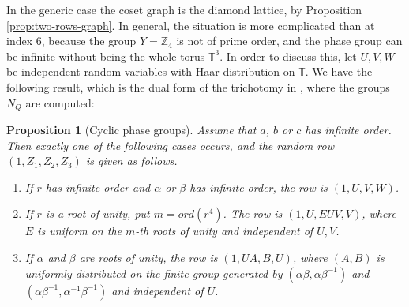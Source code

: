 \documentclass[11pt,reqno]{amsart}
\newtheorem{prop}[thm]{Proposition}
\theoremstyle{definition}
\numberwithin{equation}{section}
\begin{document}
In the generic case the coset graph is the diamond lattice, by Proposition \ref{prop:two-rows-graph}. In general, the situation is more complicated than at index 6, because the group $Y=\mathbb Z_4$ is not of prime order, and the phase group can be infinite without being the whole torus $\mathbb T^3$. In order to discuss this, let $U,V,W$ be independent random variables with Haar distribution on $\mathbb T$. We have the following result, which is the dual form of the trichotomy in \cite[Theorem 4.7]{BO26}, where the groups $N_Q$ are computed:

\begin{prop}[Cyclic phase groups]\label{prop:eight-cyclic}
Assume that $a$, $b$ or $c$ has infinite order. Then exactly one of the following cases occurs, and the random row $(1,Z_1,Z_2,Z_3)$ is given as follows.
\begin{enumerate}
\item If $r$ has infinite order and $\alpha$ or $\beta$ has infinite order, the row is $(1,U,V,W)$.
\item If $r$ is a root of unity, put $m=ord(r^4)$. The row is $(1,U,EUV,V)$, where $E$ is uniform on the $m$-th roots of unity and independent of $U,V$.
\item If $\alpha$ and $\beta$ are roots of unity, the row is $(1,UA,B,U)$, where $(A,B)$ is uniformly distributed on the finite group generated by $(\alpha\beta,\alpha\beta^{-1})$ and $(\alpha\beta^{-1},\alpha^{-1}\beta^{-1})$ and independent of $U$.
\end{enumerate}
\end{prop}
\end{document}
